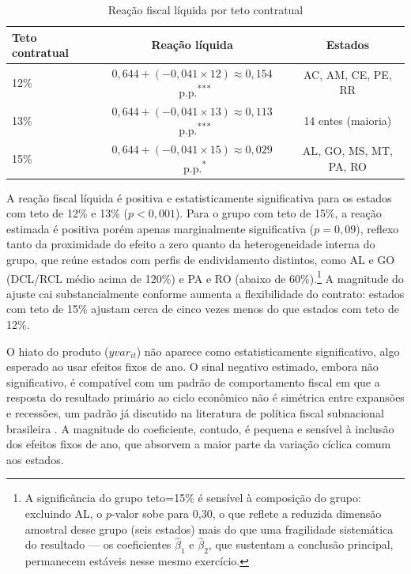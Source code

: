 \vspace{0.8cm}
\begin{table}[H]
\centering
\caption{Reação fiscal líquida por teto contratual}
\label{tab:reacao_liquida}
\begin{tabular}{lcc}
\toprule
Teto contratual & Reação líquida & Estados \\
\midrule
12\% & $0{,}644 + (-0{,}041 \times 12) \approx 0{,}154$~p.p.\textsuperscript{***}
     & AC, AM, CE, PE, RR \\
13\% & $0{,}644 + (-0{,}041 \times 13) \approx 0{,}113$~p.p.\textsuperscript{***}
     & 14 entes (maioria) \\
15\% & $0{,}644 + (-0{,}041 \times 15) \approx 0{,}029$~p.p.\textsuperscript{*}
     & AL, GO, MS, MT, PA, RO \\
\bottomrule
\end{tabular}
\end{table}
\vspace{0.8cm}


A reação fiscal líquida é positiva e estatisticamente significativa para os estados com teto de 12\% e 13\% ($p < 0{,}001$). Para o grupo com teto de 15\%, a reação estimada é positiva porém apenas marginalmente significativa ($p = 0{,}09$), reflexo tanto da proximidade do efeito a zero quanto da heterogeneidade interna do grupo, que reúne estados com perfis de endividamento distintos, como AL e GO (DCL/RCL médio acima de 120\%) e PA e RO (abaixo de 60\%).\footnote{A significância do grupo teto=15\% é sensível à composição do grupo: excluindo AL, o $p$-valor sobe para 0,30, o que reflete a reduzida dimensão amostral desse grupo (seis estados) mais do que uma fragilidade sistemática do resultado --- os coeficientes $\hat{\beta}_1$ e $\hat{\beta}_2$, que sustentam a conclusão principal, permanecem estáveis nesse mesmo exercício.} A magnitude do ajuste cai substancialmente conforme aumenta a flexibilidade do contrato: estados com teto de 15\% ajustam cerca de cinco vezes menos do que estados com teto de 12\%.

O hiato do produto ($yvar_{it}$) não aparece como estatisticamente significativo, algo esperado ao usar efeitos fixos de ano. O sinal negativo estimado, embora não significativo, é compatível com um padrão de comportamento fiscal em que a resposta do resultado primário ao ciclo econômico não é simétrica entre expansões e recessões, um padrão já discutido na literatura de política fiscal subnacional brasileira \cite{moraFederalismoEndividamentoSubnacional2007}. A magnitude do coeficiente, contudo, é pequena e sensível à inclusão dos efeitos fixos de ano, que absorvem a maior parte da variação cíclica comum aos estados.

